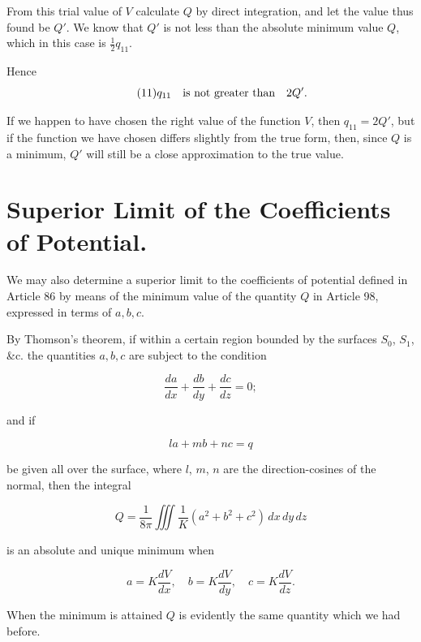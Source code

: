 \documentclass[11pt,a4paper]{article}
\begin{document}
From this trial value of $V$ calculate $Q$ by direct integration, and let the value thus found be $Q'$. We know that $Q'$ is not less than the absolute minimum value $Q$, which in this case is $\frac{1}{2}q_{11}$.

Hence
\begin{equation}\tag{11}
q_{11}\quad\hbox{is not greater than}\quad 2Q'.
\end{equation}

If we happen to have chosen the right value of the function $V$, then $q_{11}=2Q'$, but if the function we have chosen differs slightly from the true form, then, since $Q$ is a minimum, $Q'$ will still be a close approximation to the true value.

\section*{Superior Limit of the Coefficients of Potential.}

We may also determine a superior limit to the coefficients of potential defined in Article 86 by means of the minimum value of the quantity $Q$ in Article 98, expressed in terms of $a,b,c$.

By Thomson's theorem, if within a certain region bounded by the surfaces $S_0$, $S_1$, \&c. the quantities $a,b,c$ are subject to the condition

\begin{equation}\tag{12}
\frac{da}{dx}+\frac{db}{dy}+\frac{dc}{dz}=0;
\end{equation}

and if

\begin{equation}\tag{13}
la+mb+nc=q
\end{equation}

be given all over the surface, where $l$, $m$, $n$ are the direction-cosines of the normal, then the integral

\begin{equation}\tag{14}
Q = \frac{1}{8\pi} \iiint \frac{1}{K} (a^2 + b^2 + c^2) \, dx \, dy \, dz
\end{equation}

is an absolute and unique minimum when

\begin{equation}\tag{15}
a = K \frac{dV}{dx}, \quad b = K \frac{dV}{dy}, \quad c = K \frac{dV}{dz}.
\end{equation}

When the minimum is attained $Q$ is evidently the same quantity which we had before.
\end{document}
